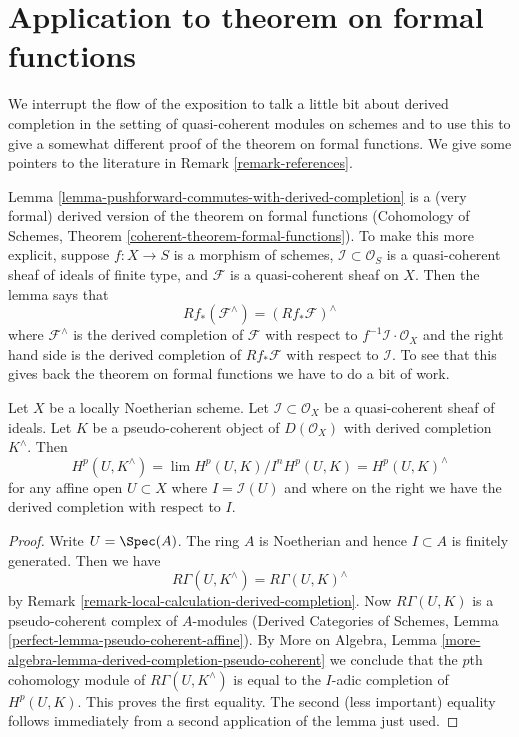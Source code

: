 \section{Application to theorem on formal functions}
\label{section-formal-functions}

\noindent
We interrupt the flow of the exposition to talk a little bit about
derived completion in the setting of quasi-coherent modules on schemes
and to use this to give a somewhat different proof of the theorem on
formal functions. We give some pointers to the literature in
Remark \ref{remark-references}.

\medskip\noindent
Lemma \ref{lemma-pushforward-commutes-with-derived-completion} is a
(very formal) derived version of the theorem on formal functions
(Cohomology of Schemes, Theorem \ref{coherent-theorem-formal-functions}).
To make this more explicit, suppose $f : X \to S$ is a morphism of schemes,
$\mathcal{I} \subset \mathcal{O}_S$ is a quasi-coherent sheaf of ideals
of finite type,
and $\mathcal{F}$ is a quasi-coherent sheaf on $X$. Then the lemma says that
\begin{equation}
\label{equation-formal-functions}
Rf_*(\mathcal{F}^\wedge) = (Rf_*\mathcal{F})^\wedge
\end{equation}
where $\mathcal{F}^\wedge$ is the derived completion of $\mathcal{F}$
with respect to $f^{-1}\mathcal{I} \cdot \mathcal{O}_X$ and the right
hand side is the derived completion of $Rf_*\mathcal{F}$
with respect to $\mathcal{I}$. To see that this gives back the theorem
on formal functions we have to do a bit of work.

\begin{lemma}
\label{lemma-sections-derived-completion-pseudo-coherent}
Let $X$ be a locally Noetherian scheme. Let $\mathcal{I} \subset \mathcal{O}_X$
be a quasi-coherent sheaf of ideals. Let $K$ be a
pseudo-coherent object of $D(\mathcal{O}_X)$ with derived completion
$K^\wedge$. Then
$$
H^p(U, K^\wedge) = \lim H^p(U, K)/I^nH^p(U, K) =
H^p(U, K)^\wedge
$$
for any affine open $U \subset X$
where $I = \mathcal{I}(U)$ and where on the right we have the derived
completion with respect to $I$.
\end{lemma}

\begin{proof}
Write $U = \Spec(A)$. The ring $A$ is Noetherian
and hence $I \subset A$ is finitely generated. Then we have
$$
R\Gamma(U, K^\wedge) = R\Gamma(U, K)^\wedge
$$
by Remark \ref{remark-local-calculation-derived-completion}.
Now $R\Gamma(U, K)$ is a pseudo-coherent complex of $A$-modules
(Derived Categories of Schemes, Lemma
\ref{perfect-lemma-pseudo-coherent-affine}).
By More on Algebra, Lemma
\ref{more-algebra-lemma-derived-completion-pseudo-coherent}
we conclude that the $p$th cohomology module of $R\Gamma(U, K^\wedge)$
is equal to the $I$-adic completion of $H^p(U, K)$.
This proves the first equality. The second (less important) equality
follows immediately from a second application of the lemma just used.
\end{proof}

